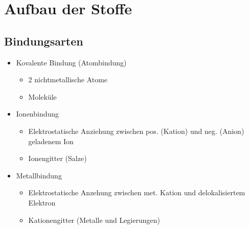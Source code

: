 \section{Aufbau der Stoffe}

\subsection{Bindungsarten}
\begin{itemize}
	\item Kovalente Bindung (Atombindung)
		\begin{itemize}
			\item 2 nichtmetallische Atome
			\item Moleküle
		\end{itemize}
	\item Ionenbindung
		\begin{itemize}
			\item Elektrostatische Anziehung zwischen pos. (Kation) und neg. (Anion) geladenem Ion
			\item Ionengitter (Salze)
		\end{itemize}
	\item Metallbindung
		\begin{itemize}
			\item Elektrostatische Anzehung zwischen met. Kation und delokalisiertem Elektron
			\item Kationengitter (Metalle und Legierungen)
		\end{itemize}
\end{itemize}

